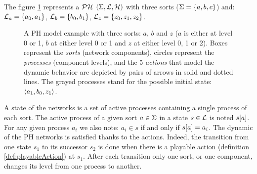 \begin{example*}
The figure \ref{fig:ph} represents a $\mathcal{PH}$ $(\Sigma,\mathcal{L},\mathcal{H})$ with three sorts
($\Sigma = \{a, b, c\}$) and:
$\mathcal{L}_a = \{a_0, a_1\}$,
$\mathcal{L}_b = \{b_0, b_1\}$,
$\mathcal{L}_z = \{z_0, z_1, z_2\}$.
\begin{figure}[ht]
\label{fig:ph} 
\centering
{}
\caption{
A PH model example with three sorts: $a$, $b$ and $z$ ($a$ is either at level 0 or 1, $b$ at either level 0 or 1 and $z$ at either level 0, 1 or 2). Boxes represent the \emph{sorts} (network components), circles represent the \emph{processes} (component levels), and the 5 \emph{actions} that model the dynamic behavior are depicted by pairs of arrows in solid and dotted lines. The grayed processes stand for the possible initial state: $\mbox{$\langle a_1, b_0, z_1 \rangle$}$.
}
\end{figure}
\end{example*}

A state of the networks is a set of active processes containing a single process of each sort.
The active process of a given sort $a \in \Sigma$ in a state $s \in \mathcal{L}$
is noted ${s[a]}$.
For any given process $a_i$ we also note: $a_i \in s$ if and only if ${s[a]} = a_i$. The dynamic of the PH networks is satisfied thanks to the actions. Indeed, the transition from one state $s_1$ to its successor $s_2$ is done when there is a playable action (definition \ref{def:playableAction}) at $s_1$. After each transition only one sort, or one component, changes its level from one process to another.


